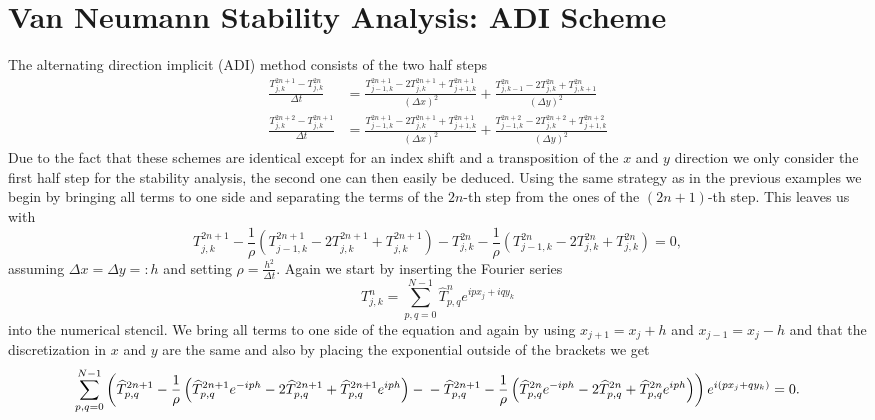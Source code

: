 \documentclass[a4aper,pagesize]{scrartcl}
\theoremstyle{definition}
\theoremstyle{plain}
\theoremstyle{remark}
\renewcommand{\hat}{\widehat}
\begin{document}
\section{Van Neumann Stability Analysis: ADI Scheme}
The alternating direction implicit (ADI) method  consists of the two half steps
\begin{align}
	\frac{T_{j,k}^{2n+1} - T_{j,k}^{2n}}{\Delta t}
	&= \frac{T_{j-1,k}^{2n+1} - 2 T_{j,k}^{2n+1} + T_{j+1,k}^{2n+1}}{(\Delta x)^2}
	+ \frac{T_{j,k-1}^{2n} - 2 T_{j,k}^{2n} + T_{j,k+1}^{2n}}{(\Delta y)^2}
\\
	\frac{T_{j,k}^{2n+2} - T_{j,k}^{2n+1}}{\Delta t}
	&= \frac{T_{j-1,k}^{2n+1} - 2 T_{j,k}^{2n+1} + T_{j+1,k}^{2n+1}}{(\Delta x)^2}
	+ \frac{T_{j-1,k}^{2n+2} - 2 T_{j,k}^{2n+2} + T_{j+1,k}^{2n+2}}{(\Delta y)^2}
\end{align}
Due to the fact that these schemes are identical except for an index shift and a transposition of the $x$ and $y$ direction we only consider the first half step for the stability analysis, the second one can then easily be deduced. Using the same strategy as in the previous examples we begin by bringing all terms to one side and separating the terms of the $2n$-th step from the ones of the $(2n+1)$-th step. This leaves us with
\begin{equation}
	T_{j,k}^{2n+1}
	- \frac{1}{\rho}\left(
		T_{j-1,k}^{2n+1}
		-2T_{j,k}^{2n+1}
		+T_{j,k}^{2n+1}
	\right)
	-T_{j,k}^{2n}
	- \frac{1}{\rho}\left(
		T_{j-1,k}^{2n}
		-2T_{j,k}^{2n}
		+T_{j,k}^{2n}
	\right)
	=
	0,
\end{equation}
assuming $\Delta x = \Delta y =: h$ and setting $\rho = \frac{h^2}{\Delta t}$. Again we start by inserting the Fourier series
\begin{equation}
	T_{j,k}^n = \sum_{p,q = 0}^{N-1} \hat{T}^n_{p,q} e^{ipx_j + iqy_k}
\end{equation}
into the numerical stencil. We bring all terms to one side of the equation and again by using $x_{j+1} = {x_j} + h$ and $x_{j-1} = {x_j} - h$ and that the discretization in $x$ and $y$ are the same and also by placing the exponential outside of the brackets we get
\begin{dmath}
	\sum_{p,q = 0}^{N-1}\left(
		\hat{T}_{p,q}^{2n+1}
		-\frac{1}{\rho}\left(
			\hat{T}_{p,q}^{2n+1} e^{-iph}
			- 2 \hat{T}_{p,q}^{2n+1}
			+ \hat{T}_{p,q}^{2n+1} e^{iph}
		\right)
		-\\
		-\hat{T}_{p,q}^{2n+1}
		-\frac{1}{\rho}\left(
			\hat{T}_{p,q}^{2n} e^{-iph}
			- 2 \hat{T}_{p,q}^{2n}
			+ \hat{T}_{p,q}^{2n} e^{iph}
		\right)
	\right)
	e^{i(px_j + qy_k)}
	=
	0.
\end{dmath}
\end{document}
